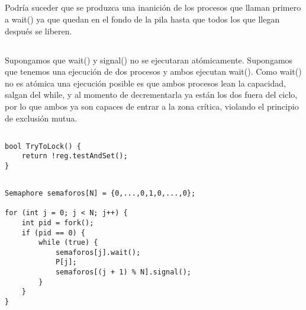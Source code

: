 \subsection{}

Podría suceder que se produzca una inanición de los procesos que llaman
primero a wait() ya que quedan en el fondo de la pila hasta que todos los que
llegan después se liberen.

\subsection{}

Supongamos que wait() y signal() no se ejecutaran atómicamente. Supongamos que
tenemos una ejecución de dos procesos y ambos ejecutan wait(). Como wait() no
es atómica una ejecución posible es que ambos procesos lean la capacidad,
salgan del while, y al momento de decrementarla ya están los dos fuera del
ciclo, por lo que ambos ya son capaces de entrar a la zona crítica, violando
el principio de exclusión mutua.

\setcounter{subsection}{7}
\subsection{}

\begin{codesnippet}
\begin{verbatim}
bool TryToLock() {
    return !reg.testAndSet();
}
\end{verbatim}
\end{codesnippet}

\subsection{}

\begin{codesnippet}
\begin{verbatim}
Semaphore semaforos[N] = {0,...,0,1,0,...,0};

for (int j = 0; j < N; j++) {
    int pid = fork();
    if (pid == 0) {
        while (true) {
            semaforos[j].wait();
            P[j];
            semaforos[(j + 1) % N].signal();
        }
    }
}
\end{verbatim}
\end{codesnippet}

\subsection{}

